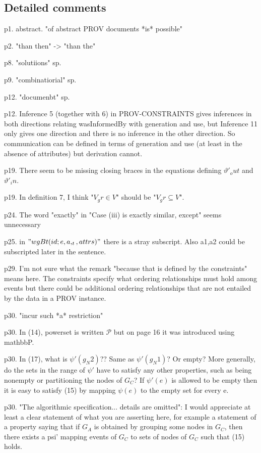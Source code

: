 \documentclass{article}
\begin{document}
\subsection*{Detailed comments}

p1. abstract. "of abstract PROV documents *is* possible"

p2. "than then" -> "than the"

p8. "solutiions" sp.

p9. "combinatiorial" sp.

p12. "documenbt" sp.

p12. Inference 5 (together with 6) in PROV-CONSTRAINTS gives inferences in both directions relating wasInformedBy with generation and use, but Inference 11 only gives one direction and there is no inference in the other direction. So communication can be defined in terms of generation and use (at least in the absence of attributes) but derivation cannot. 

p19.  There seem to be missing closing braces in the equations defining $\vartheta'_out$ and $\vartheta'_in$.

p19.  In definition 7, I think "$V_gr \in V$" should be "$V_gr \subseteq V$".

p24.  The word "exactly" in "Case (iii) is exactly similar, except" seems unnecessary

p25.  in $"wgBt(id;e,a,_t,attrs)"$ there is a stray subscript.  Also a1,a2 could be subscripted later in the sentence.

p29.  I'm not sure what the remark "because that is defined by the constraints" means here.  The constraints specify what ordering relationships must hold among events but there could be additional ordering relationships that are not entailed by the data in a PROV instance.

p30. "incur such *a* restriction"


p30.  In (14), powerset is written  $\mathcal{P}$ but on page 16 it was introduced using mathbb{P}.

p30. In (17), what is $\psi'(g_N2)$??  Same as $\psi'(g_N1)$?  Or empty?  More generally, do the sets in the range of $\psi'$ have to satisfy any other properties, such as being nonempty or partitioning the nodes of $G_C$?  If $\psi'(e)$ is allowed to be empty then it is easy to satisfy (15) by mapping $\psi(e)$ to the empty set for every e.

p30. "The algorithmic specification... details are omitted": I would appreciate at least a clear statement of what you are asserting here, for example a statement of a property saying that if $G_A$ is obtained by grouping some nodes in $G_C$, then there exists a psi' mapping events of $G_C$ to sets of nodes of $G_C$ such that (15) holds.  
\end{document}
